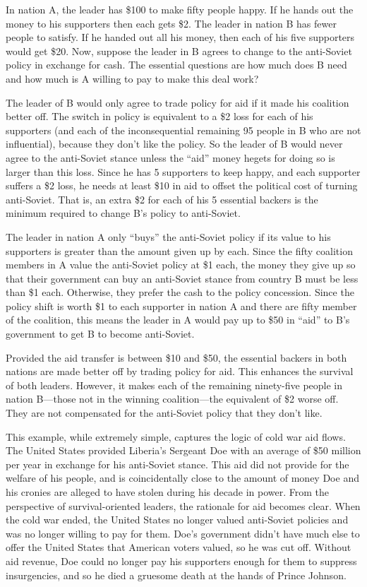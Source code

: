 \documentclass[10pt]{article}
\begin{document}
{\large In nation A, the leader has \$100 to make fifty people happy. If he
hands out the money to his supporters then each gets \$2. The leader in nation B
has fewer people to satisfy. If he handed out all his money, then each of his
five supporters would get \$20. Now, suppose the leader in B agrees to change to
the anti-Soviet policy in exchange for cash. The essential questions are how much
does B need and how much is A willing to pay to make this deal work?}

{\large The leader of B would only agree to trade policy for aid if it made his
coalition better off. The switch in policy is equivalent to a \$2 loss for each
of his supporters (and each of the inconsequential remaining 95 people in B who
are not influential), because they don't like the policy. So the leader of B
would never agree to the anti-Soviet stance unless the ``aid'' money hegets for
doing so is larger than this loss. Since he has 5 supporters to keep happy, and
each supporter suffers a \$2 loss, he needs at least \$10 in aid to offset the
political cost of turning anti-Soviet. That is, an extra \$2 for each of his 5
essential backers is the minimum required to change B's policy to anti-Soviet.}

{\large The leader in nation A only ``buys'' the anti-Soviet policy if its value
to his supporters is greater than the amount given up by each. Since the fifty
coalition members in A value the anti-Soviet policy at \$1 each, the money they
give up so that their government can buy an anti-Soviet stance from country B
must be less than \$1 each. Otherwise, they prefer the cash to the policy
concession. Since the policy shift is worth \$1 to each supporter in nation A and
there are fifty member of the coalition, this means the leader in A would pay up
to \$50 in ``aid'' to B's government to get B to become anti-Soviet.}

{\large Provided the aid transfer is between \$10 and \$50, the essential
backers in both nations are made better off by trading policy for aid. This
enhances the survival of both leaders. However, it makes each of the remaining
ninety-five people in nation B---those not in the winning coalition---the
equivalent of \$2 worse off. They are not compensated for the anti-Soviet policy
that they don't like.}

{\large This example, while extremely simple, captures the logic of cold war aid
flows. The United States provided Liberia's Sergeant Doe with an average of \$50
million per year in exchange for his anti-Soviet stance. This aid did not provide
for the welfare of his people, and is coincidentally close to the amount of money
Doe and his cronies are alleged to have stolen during his decade in power. From
the perspective of survival-oriented leaders, the rationale for aid becomes
clear. When the cold war ended, the United States no longer valued anti-Soviet
policies and was no longer willing to pay for them. Doe's government didn't have
much else to offer the United States that American voters valued, so he was cut
off. Without aid revenue, Doe could no longer pay his supporters enough for them
to suppress insurgencies, and so he died a gruesome death at the hands of Prince
Johnson.}
\end{document}
